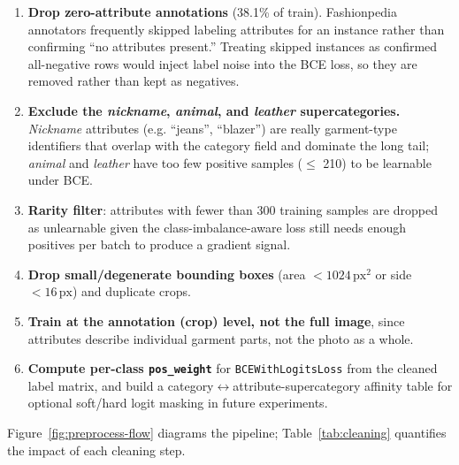 \documentclass[11pt]{article}
\newcommand{\code}[1]{\texttt{\small #1}}
\begin{document}
\begin{enumerate}
\item \textbf{Drop zero-attribute annotations} (38.1\% of train). Fashionpedia annotators frequently skipped labeling attributes for an instance rather than confirming ``no attributes present.'' Treating skipped instances as confirmed all-negative rows would inject label noise into the BCE loss, so they are removed rather than kept as negatives.
\item \textbf{Exclude the \emph{nickname}, \emph{animal}, and \emph{leather} supercategories.} \emph{Nickname} attributes (e.g. ``jeans'', ``blazer'') are really garment-type identifiers that overlap with the category field and dominate the long tail; \emph{animal} and \emph{leather} have too few positive samples ($\leq$ 210) to be learnable under BCE.
\item \textbf{Rarity filter}: attributes with fewer than 300 training samples are dropped as unlearnable given the class-imbalance-aware loss still needs enough positives per batch to produce a gradient signal.
\item \textbf{Drop small/degenerate bounding boxes} (area $< 1024\,\text{px}^2$ or side $< 16\,\text{px}$) and duplicate crops.
\item \textbf{Train at the annotation (crop) level, not the full image}, since attributes describe individual garment parts, not the photo as a whole.
\item \textbf{Compute per-class \code{pos\_weight}} for \code{BCEWithLogitsLoss} from the cleaned label matrix, and build a category$\leftrightarrow$attribute-supercategory affinity table for optional soft/hard logit masking in future experiments.
\end{enumerate}

Figure~\ref{fig:preprocess-flow} diagrams the pipeline; Table~\ref{tab:cleaning} quantifies the impact of each cleaning step.
\end{document}
